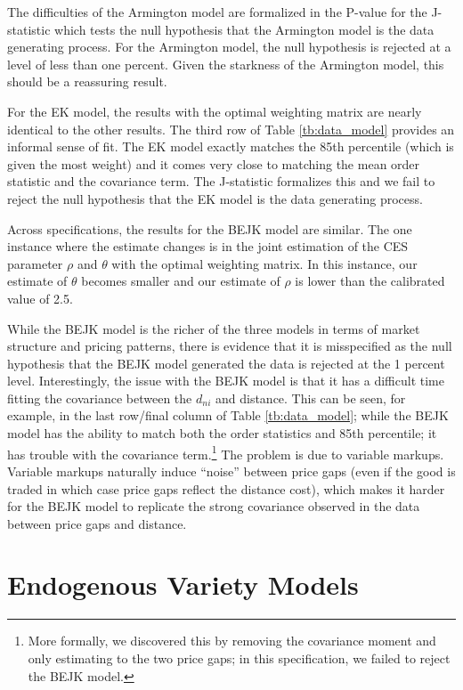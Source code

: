 \documentclass[12pt,dvips, ps2pdf]{article}
\begin{document}
The difficulties of the Armington model are formalized in the P-value for the J-statistic which tests the null hypothesis that the Armington model is the data generating process. For the Armington model, the null hypothesis is rejected at a level of less than one percent. Given the starkness of the Armington model, this should be a reassuring result.

For the EK model, the results with the optimal weighting matrix are nearly identical to the other results. The third row of Table \ref{tb:data_model} provides an informal sense of fit. The EK model exactly matches the 85th percentile (which is given the most weight) and it comes very close to matching the mean order statistic and the covariance term. The J-statistic formalizes this and we fail to reject the null hypothesis that the EK model is the data generating process.

Across specifications, the results for the BEJK model are similar. The one instance where the estimate changes is in the joint estimation of the CES parameter $\rho$ and $\theta$ with the optimal weighting matrix. In this instance, our estimate of $\theta$ becomes smaller and our estimate of $\rho$ is lower than the calibrated value of 2.5.

While the BEJK model is the richer of the three models in terms of market structure and pricing patterns, there is evidence that it is misspecified as the null hypothesis that the BEJK model generated the data is rejected at the 1 percent level. Interestingly, the issue with the BEJK model is that it has a difficult time fitting the covariance between the $d_{ni}$ and distance. This can be seen, for example, in the last row/final column of Table \ref{tb:data_model}; while the BEJK model has the ability to match both the order statistics and 85th percentile; it has trouble with the covariance term.\footnote{More formally, we discovered this by removing the covariance moment and only estimating to the two price gaps; in this specification, we failed to reject the BEJK model.} The problem is due to variable markups. Variable markups naturally induce ``noise'' between price gaps (even if the good is traded in which case price gaps reflect the distance cost), which makes it harder for the BEJK model to replicate the strong covariance observed in the data between price gaps and distance.

\section{Endogenous Variety Models}
\end{document}
